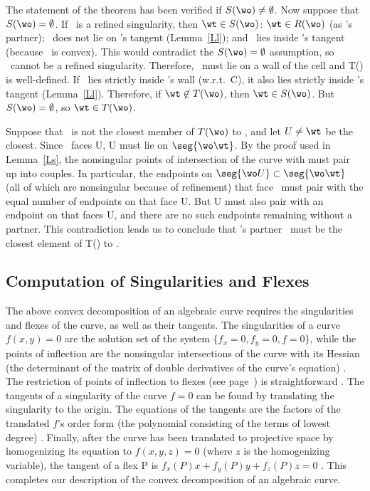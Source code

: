 The statement of the theorem has been verified if $S(\wo) \neq \emptyset$.
Now suppose that $S(\wo) = \emptyset$.
If \wo\ is a refined singularity, then $\wt \in S(\wo)$:
$\wt \in R(\wo)$ (as \wo's partner);
\wt\ does not lie on \wo's tangent (Lemma~\ref{Ll});
and \wt\ lies inside \wo's tangent (because \wwa\ is convex).  
This would contradict the $S(\wo) = \emptyset$ assumption, so \wo\ cannot
be a refined singularity.
Therefore, \wo\ must lie on a wall of the cell and T(\wo) is well-defined.
If \wt\ lies strictly inside \wo's wall (w.r.t.\ C), it also lies strictly
inside \wo's tangent (Lemma~\ref{Ll}).
Therefore, if $\wt \not \in T(\wo)$, then $\wt \in S(\wo)$.
But $S(\wo) = \emptyset$, so $\wt \in T(\wo)$.

Suppose that \wt\ is not the closest member of $T(\wo)$ to \wo, and let 
\mbox{$U \neq \wt$} be the closest.  
Since \wo\ faces U, U must lie on $\seg{\wo\wt}$.
By the proof used in Lemma~\ref{Ls}, the nonsingular points of 
intersection of the curve with \seg{\wo\wt} must pair up into couples.
In particular, the endpoints on $\seg{\wo U} \subset \seg{\wo\wt}$ 
(all of which are nonsingular because of refinement) that face 
\wo\ must pair with the equal number of endpoints on  that face U.
But U must also pair with an endpoint on  that faces U,
and there are no such endpoints remaining without a partner.
This contradiction leads us to conclude that \wo's partner \wt\ must be the 
closest element of T(\wo) to \wo.
\QED

\subsection{Computation of Singularities and Flexes}
\label{ssc}

The above convex decomposition of an algebraic curve requires the singularities 
and flexes of the curve, as well as their tangents.
The singularities of a curve $f(x,y)=0$ are the solution set of the system
$\{f_{x}=0,f_{y}=0,f=0\}$, while the points of inflection are the nonsingular 
intersections of the curve with its Hessian (the determinant 
of the matrix of double derivatives of the curve's equation) \cite{walker}.
The restriction of points of inflection to flexes (see page~\pageref{restriction})
is straightforward \cite{jj}.
The tangents of a singularity of the curve $f=0$ can be found by translating 
the singularity to the origin.
The equations of the tangents are the factors of the translated $f$'s order
form (the polynomial consisting of the terms of lowest degree) \cite{walker}.
Finally, after the curve has been translated to projective space by homogenizing 
its equation to $f(x,y,z)=0$ (where $z$ is the homogenizing variable),
the tangent of a flex P is $f_{x}(P)x + f_{y}(P)y + f_{z}(P)z= 0$ \cite{walker}.
This completes our description of the convex decomposition of an algebraic curve.

